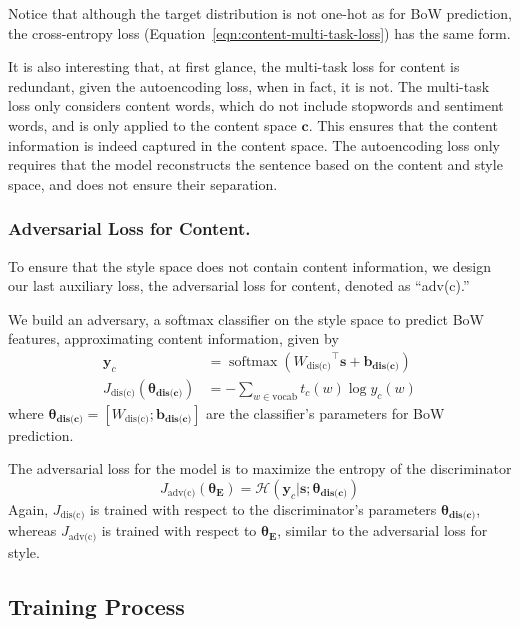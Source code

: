 \documentclass[letterpaper]{article} %
\newcommand{\loss}[1]{J_{\text{#1}}}
\newcommand{\nnweight}[1]{\bm{\theta_{\text{#1}}}}
\newcommand{\weight}[1]{W_{\text{#1}}}
\newcommand{\bias}[1]{\bm{b_{\text{#1}}}}
\begin{document}
Notice that although the target distribution is not one-hot as for BoW prediction, the cross-entropy loss (Equation~\ref{eqn:content-multi-task-loss}) has the same form. 

It is also interesting that, at first glance, the multi-task loss for content is redundant, given the autoencoding loss, when in fact, it is not. The multi-task loss only considers content words, which do not include stopwords and sentiment words, and is only applied to the content space $\bm c$. This ensures that the content information is indeed captured in the content space. The autoencoding loss only requires that the model reconstructs the sentence based on the content and style space, and does not ensure their separation.

\subsubsection{Adversarial Loss for Content.} \label{ssec:adversarial-content-objective}

To ensure that the style space does not contain content information, we design our last auxiliary loss, the adversarial loss for content, denoted as ``adv(c).''

We build an adversary, a softmax classifier on the style space to predict BoW features, approximating content information, given by
\begin{align}
	\label{eqn:adv-bow-disc-loss}
	\bm y_c                          & = \operatorname{softmax}({\weight{dis(c)}}^\top \bm s + \bias{dis(c)}) \\
	\loss{dis(c)}(\nnweight{dis(c)}) & = - \sum\nolimits_{w\in\text{vocab}} t_c(w)\log y_c(w)
\end{align}
where $\nnweight{dis(c)}=[\weight{dis(c)}; \bias{dis(c)}]$ are the classifier's parameters for BoW prediction.

The adversarial loss for the model is to maximize the entropy of the discriminator
\begin{equation}
	\loss{adv(c)}(\nnweight{E}) = \mathcal{H}(\bm y_c | \bm s; \nnweight{dis(c)})
\end{equation}
Again, $\loss{dis(c)}$ is trained with respect to the discriminator's parameters $\nnweight{dis(c)}$, whereas $\loss{adv(c)}$ is trained with respect to $\nnweight{E}$, similar to the adversarial loss for style.




\subsection{Training Process}
\end{document}
